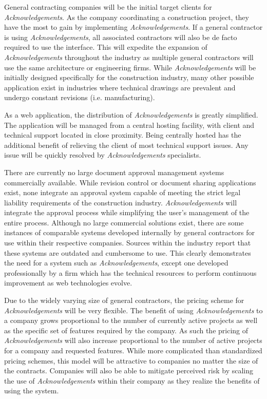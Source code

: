 General contracting companies will be the initial target clients for {\it Acknowledgements}. As the company coordinating a construction project, they have the most to gain by implementing {\it Acknowledgements}. If a general contractor is using {\it Acknowledgements}, all associated contractors will also be de facto required to use the interface. This will expedite the expansion of {\it Acknowledgements} throughout the industry as multiple general contractors will use the same architecture or engineering firms. While {\it Acknowledgements} will be initially designed specifically for the construction industry, many other possible application exist in industries where technical drawings are prevalent and undergo constant revisions (i.e. manufacturing). 

As a web application, the distribution of {\it Acknowledgements} is greatly simplified. The application will be managed from a central hosting facility, with client and technical support located in close proximity. Being centrally hosted has the additional benefit of relieving the client of most technical support issues. Any issue will be quickly resolved by {\it Acknowledgements} specialists.

There are currently no large document approval management systems commercially available. While revision control or document sharing applications exist, none integrate an approval system capable of meeting the strict legal liability requirements of the construction industry. {\it Acknowledgements} will integrate the approval process while simplifying the user's management of the entire process. Although no large commercial solutions exist, there are some instances of comparable systems developed internally by general contractors for use within their respective companies. Sources within the industry report that these systems are outdated and cumbersome to use. This clearly demonstrates the need for a system such as {\it Acknowledgements}, except one developed professionally by a firm which has the technical resources to perform continuous improvement as web technologies evolve.

Due to the widely varying size of general contractors, the pricing scheme for {\it Acknowledgements} will be very flexible. The benefit of using {\it Acknowledgements} to a company grows proportional to the number of currently active projects as well as the specific set of features required by the company. As such the pricing of {\it Acknowledgements} will also increase proportional to the number of active projects for a company and requested features. While more complicated than standardized pricing schemes, this model will be attractive to companies no matter the size of the contracts. Companies will also be able to mitigate perceived risk by scaling the use of {\it Acknowledgements} within their company as they realize the benefits of using the system.

